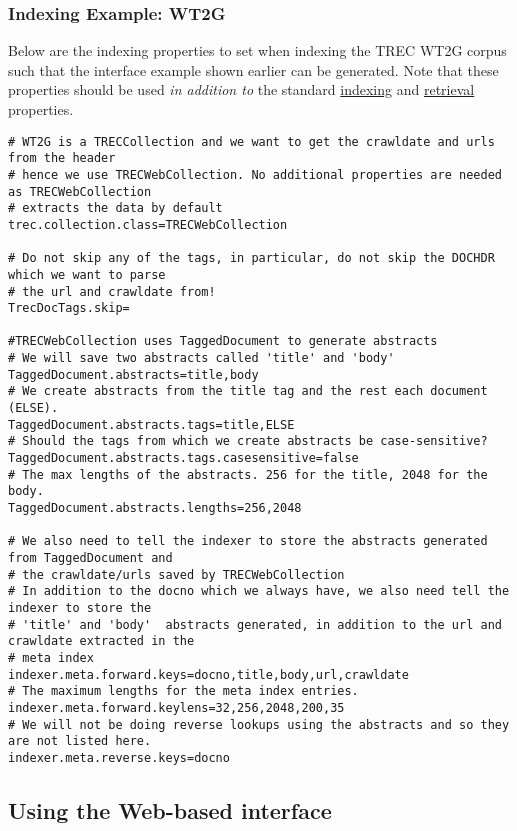 \subsubsection{Indexing Example: WT2G}\label{indexing-example-wt2g}

Below are the indexing properties to set when indexing the TREC WT2G
corpus such that the interface example shown earlier can be generated.
Note that these properties should be used \emph{in addition to} the
standard \href{configure_indexing.html}{indexing} and
\href{configure_retrieval.html}{retrieval} properties.

\begin{verbatim}
# WT2G is a TRECCollection and we want to get the crawldate and urls from the header
# hence we use TRECWebCollection. No additional properties are needed as TRECWebCollection
# extracts the data by default
trec.collection.class=TRECWebCollection

# Do not skip any of the tags, in particular, do not skip the DOCHDR which we want to parse
# the url and crawldate from!
TrecDocTags.skip=

#TRECWebCollection uses TaggedDocument to generate abstracts
# We will save two abstracts called 'title' and 'body'
TaggedDocument.abstracts=title,body
# We create abstracts from the title tag and the rest each document (ELSE).
TaggedDocument.abstracts.tags=title,ELSE
# Should the tags from which we create abstracts be case-sensitive?
TaggedDocument.abstracts.tags.casesensitive=false
# The max lengths of the abstracts. 256 for the title, 2048 for the body.
TaggedDocument.abstracts.lengths=256,2048

# We also need to tell the indexer to store the abstracts generated from TaggedDocument and
# the crawldate/urls saved by TRECWebCollection
# In addition to the docno which we always have, we also need tell the indexer to store the
# 'title' and 'body'  abstracts generated, in addition to the url and crawldate extracted in the
# meta index
indexer.meta.forward.keys=docno,title,body,url,crawldate
# The maximum lengths for the meta index entries.
indexer.meta.forward.keylens=32,256,2048,200,35
# We will not be doing reverse lookups using the abstracts and so they are not listed here.
indexer.meta.reverse.keys=docno
\end{verbatim}

\subsection{Using the Web-based
interface}\label{using-the-web-based-interface}

